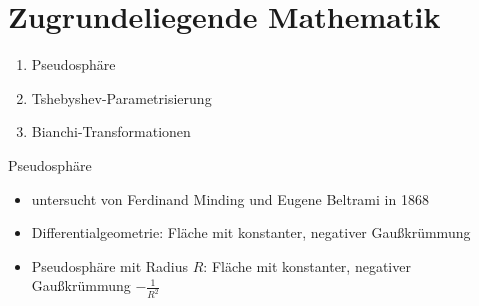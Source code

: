 \documentclass[12pt]{beamer}
\begin{document}
\section{Zugrundeliegende Mathematik}
\begin{frame}
\begin{enumerate}
\item Pseudosphäre
\item Tshebyshev-Parametrisierung
\item Bianchi-Transformationen
\end{enumerate}
\end{frame}

\begin{frame}{Pseudosphäre}

\begin{itemize}
\item untersucht von Ferdinand Minding und Eugene Beltrami in 1868
\item Differentialgeometrie: Fläche mit konstanter, negativer Gaußkrümmung
\item Pseudosphäre mit Radius $R$: Fläche mit konstanter, negativer Gaußkrümmung $-\frac{1}{R^2}$ \cite{pseudo_mathcurve}
\end{itemize}

\end{frame}
\end{document}
